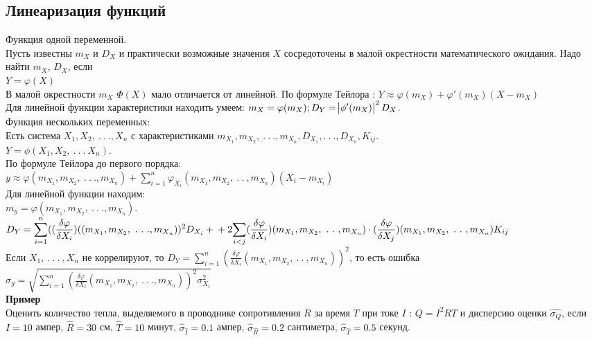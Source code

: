 \documentclass[russian, 12pt, fleqn]{article}
\begin{document}
\subsection{Линеаризация функций}
Функция одной переменной. \\
Пусть известны $m_X$ и $D_X$ и практически возможные значения $X$ сосредоточены в малой окрестности математического ожидания. Надо найти $m_X$, $D_X$, если \\
$Y = \varphi(X)$\\
В малой окрестности $m_X$ $\Phi(X)$ мало отличается от линейной. По формуле Тейлора : $Y \approx \varphi(m_X) + \varphi'(m_X) (X  - m_X)$\\
Для линейной функции характеристики находить умеем: $m_X = \varphi(m_X);\\ D_Y = \abs{\phi'(m_X)}^2 D_X$.\\
Функция нескольких переменных:\\
Есть система $X_1, X_2,\ .\ .\ . ,X_n$ с характеристиками $m_{X_1}, m_{X_2}, \ .\ .\ .  ,m_{X_n}, D_{X_1},.\ .\ ., D_{X_n}, K_{ij}$.\\
$Y=\phi(X_1, X_2, \ .\ .\ .\  X_n)$.\\
По формуле Тейлора до первого порядка:\\
 $y  \approx  \varphi(m_{X_1}, m_{X_2}, \ .\ .\ .  ,m_{X_n}) + \displaystyle{\sum \limits _{i  = 1} ^ {n} } \varphi_{X_i} (m_{X_1}, m_{X_2}, \ .\ .\ ,m_{X_n})(X_i - m_{X_i})$\\
Для линейной функции находим:\\
$m_y =  \varphi(m_{X_1}, m_{X_2}, \ .\ .\ . ,m_{X_n}) $. $D_Y =  \displaystyle{\sum \limits _{i  = 1} ^ {n} } ((\frac{\delta \varphi}{\delta X_i})((m_{X_1}, m_{X_2}, \ .\ .\ . , m_{X_n}))^2D_{X_i}  + \\ + 2\displaystyle{\sum \limits _{i  < j} } (\frac{\delta \varphi}{\delta X_i}) (m_{X_1}, m_{X_2}, \ .\ .\ ,m_{X_n})  \cdot (\frac{\delta \varphi}{\delta X_j}) (m_{X_1}, m_{X_2}, \ .\ .\ ,m_{X_n}) K_{ij}$\\
Если $X_1, \ .\ .\ .\ ,X_n$ не коррелируют, то $D_Y =  \displaystyle{\sum \limits _{i  = 1} ^ {n} } (\frac{\delta \varphi}{\delta X_i} (m_{X_1}, m_{X_2}, \ .\ .\ ,m_{X_n}))^2$, то есть ошибка $\sigma_y  = \sqrt{\displaystyle{\sum \limits _{i  = 1} ^ {n} } (\frac{\delta \varphi}{\delta X_i}(m_{X_1}, m_{X_2}, \ .\ .\ . , m_{X_n}))^2 \sigma_{X_i}^2}$\\
\textbf{Пример} \\
Оценить количество тепла, выделяемого в проводнике сопротивления $R$ за время $T$ при токе $I$ : $Q=I^2RT$ и дисперсию оценки $\hat{\sigma_Q}$, если $I=10$ ампер, $\hat{R} = 30$ см, $\hat{T} = 10$ минут, $\hat{\sigma}_{\hat{I}} = 0.1$ ампер, $\hat{\sigma}_{\hat{R}} = 0.2$ сантиметра, $\hat{\sigma}_{\hat{T}} = 0.5$ секунд.\\
\end{document}
